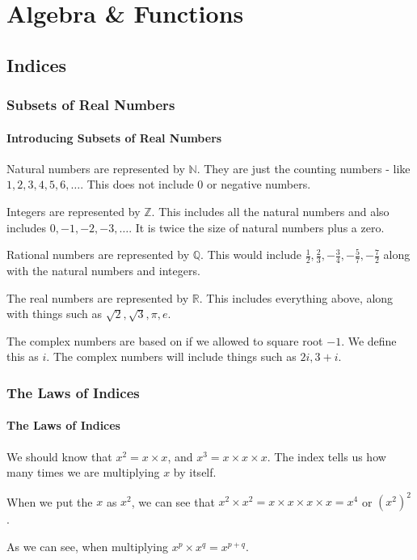 \documentclass[../maths.tex]{subfiles}
\begin{document}
\chapter{Algebra \& Functions}
\section{Indices}
\subsection*{Subsets of Real Numbers}
\subsubsection*{Introducing Subsets of Real Numbers}
Natural numbers are represented by $\mathbb{N}$. They are just the counting numbers - like $1,2,3,4,5,6,\dots$. This does not include 0 or negative numbers.

Integers are represented by $\mathbb{Z}$. This includes all the natural numbers and also includes $0,-1,-2,-3,\dots$. It is twice the size of natural numbers plus a zero.

Rational numbers are represented by $\mathbb{Q}$. This would include $\frac{1}{2}, \frac{2}{3}, -\frac{3}{4}, -\frac{5}{7}, -\frac{7}{2}$ along with the natural numbers and integers.

The real numbers are represented by $\mathbb{R}$. This includes everything above, along with things such as $\sqrt{2}, \sqrt{3}, \pi, e$.

The complex numbers are based on if we allowed to square root $-1$. We define this as $i$. The complex numbers will include things such as $2i, 3+i$.
\subsection*{The Laws of Indices}
\subsubsection*{The Laws of Indices}

We should know that $x^2 = x \times x$, and $x^3 = x \times x \times x$. The index tells us how many times we are multiplying $x$ by itself.

When we put the $x$ as $x^2$, we can see that $x^2\times x^2 = x\times x\times x\times x = x^4$ or $(x^2)^2$.

As we can see, when multiplying $x^p \times x^q = x^{p+q}$. 
\end{document}
